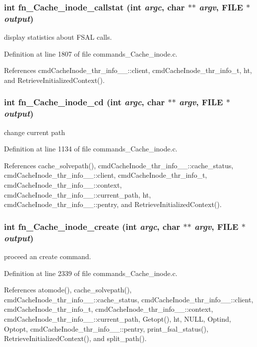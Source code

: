 \subsubsection{\setlength{\rightskip}{0pt plus 5cm}int fn\_\-Cache\_\-inode\_\-callstat (int {\em argc}, char $\ast$$\ast$ {\em argv}, FILE $\ast$ {\em output})}\label{commands_8h_a49}


display statistics about FSAL calls. 

Definition at line 1807 of file commands\_\-Cache\_\-inode.c.

References cmd\-Cache\-Inode\_\-thr\_\-info\_\-\_\-::client, cmd\-Cache\-Inode\_\-thr\_\-info\_\-t, ht, and Retrieve\-Initialized\-Context().
\subsubsection{\setlength{\rightskip}{0pt plus 5cm}int fn\_\-Cache\_\-inode\_\-cd (int {\em argc}, char $\ast$$\ast$ {\em argv}, FILE $\ast$ {\em output})}\label{commands_8h_a38}


change current path 

Definition at line 1134 of file commands\_\-Cache\_\-inode.c.

References cache\_\-solvepath(), cmd\-Cache\-Inode\_\-thr\_\-info\_\-\_\-::cache\_\-status, cmd\-Cache\-Inode\_\-thr\_\-info\_\-\_\-::client, cmd\-Cache\-Inode\_\-thr\_\-info\_\-t, cmd\-Cache\-Inode\_\-thr\_\-info\_\-\_\-::context, cmd\-Cache\-Inode\_\-thr\_\-info\_\-\_\-::current\_\-path, ht, cmd\-Cache\-Inode\_\-thr\_\-info\_\-\_\-::pentry, and Retrieve\-Initialized\-Context().
\subsubsection{\setlength{\rightskip}{0pt plus 5cm}int fn\_\-Cache\_\-inode\_\-create (int {\em argc}, char $\ast$$\ast$ {\em argv}, FILE $\ast$ {\em output})}\label{commands_8h_a45}


proceed an create command. 

Definition at line 2339 of file commands\_\-Cache\_\-inode.c.

References atomode(), cache\_\-solvepath(), cmd\-Cache\-Inode\_\-thr\_\-info\_\-\_\-::cache\_\-status, cmd\-Cache\-Inode\_\-thr\_\-info\_\-\_\-::client, cmd\-Cache\-Inode\_\-thr\_\-info\_\-t, cmd\-Cache\-Inode\_\-thr\_\-info\_\-\_\-::context, cmd\-Cache\-Inode\_\-thr\_\-info\_\-\_\-::current\_\-path, Getopt(), ht, NULL, Optind, Optopt, cmd\-Cache\-Inode\_\-thr\_\-info\_\-\_\-::pentry, print\_\-fsal\_\-status(), Retrieve\-Initialized\-Context(), and split\_\-path().
